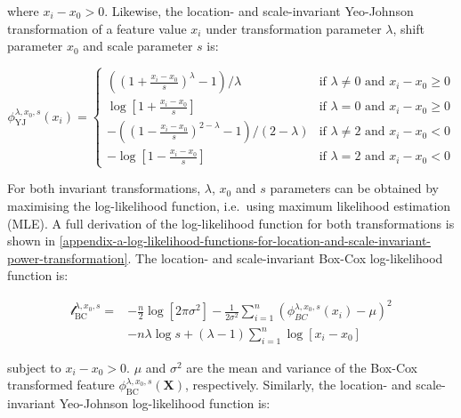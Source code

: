\documentclass[preprint,12pt,authoryear]{elsarticle}
\begin{document}
where \(x_i - x_0 > 0\). Likewise, the location- and scale-invariant
Yeo-Johnson transformation of a feature value \(x_i\) under
transformation parameter \(\lambda\), shift parameter \(x_0\) and scale
parameter \(s\) is:

\begin{equation}
\label{eqn:yeo-johnson-invariant}
\phi_{\text{YJ}}^{\lambda, x_0, s} (x_i) = 
\begin{cases}
\left( \left( 1 + \frac{x_i - x_0}{s}\right)^\lambda - 1\right) / \lambda & \text{if } \lambda \neq 0 \text{ and } x_i - x_0 \geq 0\\
\log\left[1 + \frac{x_i - x_0}{s}\right] & \text{if } \lambda = 0 \text{ and } x_i - x_0 \geq 0\\
-\left( \left( 1 - \frac{x_i - x_0}{s}\right)^{2 - \lambda} - 1 \right) / \left(2 - \lambda \right) & \text{if } \lambda \neq 2 \text{ and } x_i - x_0 < 0\\
-\log\left[1 - \frac{x_i - x_0}{s}\right] & \text{if } \lambda = 2 \text{ and } x_i - x_0 < 0
\end{cases}
\end{equation}

For both invariant transformations, \(\lambda\), \(x_0\) and \(s\)
parameters can be obtained by maximising the log-likelihood function,
i.e.~using maximum likelihood estimation (MLE). A full derivation of the
log-likelihood function for both transformations is shown in \ref{appendix-a-log-likelihood-functions-for-location-and-scale-invariant-power-transformation}.
The location- and scale-invariant Box-Cox log-likelihood function is:

\begin{equation}
\label{eqn:box-cox-invariant-log-likelihood}
\begin{split}
\mathcal{l}_{\text{BC}}^{\lambda, x_0, s} = & -\frac{n}{2} \log \left[2 \pi \sigma^2 \right] -\frac{1}{2 \sigma^2} \sum_{i=1}^n \left( \phi_{BC}^{\lambda, x_0, s}(x_i) - \mu \right)^2 \\
& -n \lambda \log s + \left( \lambda - 1 \right) \sum_{i=1}^n \log \left[ x_i - x_0 \right]
\end{split}
\end{equation}

subject to \(x_i - x_0 > 0\). \(\mu\) and \(\sigma^2\) are the mean and
variance of the Box-Cox transformed feature
\(\phi_{\text{BC}}^{\lambda, x_0, s} (\mathbf{X})\), respectively.
Similarly, the location- and scale-invariant Yeo-Johnson log-likelihood
function is:
\end{document}
